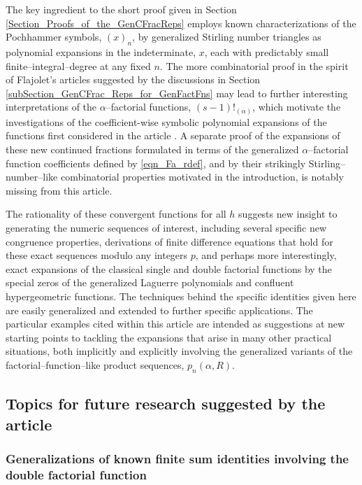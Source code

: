 \documentclass[12pt,reqno]{article}
\numberwithin{sfootnote}{section}
\numberwithin{equation}{section}
\theoremstyle{plain}
\theoremstyle{definition}
\theoremstyle{remark}
\newcommand{\Pochhammer}[2]{\ensuremath{\left(#1\right)_{#2}}}
\begin{document}
The key ingredient to the short proof given in 
Section \ref{Section_Proofs_of_the_GenCFracReps} 
employs known characterizations of the 
Pochhammer symbols, $\Pochhammer{x}{n}$, by 
generalized Stirling number triangles as 
polynomial expansions in the indeterminate, $x$, 
each with predictably small finite--integral--degree at any fixed $n$. 
The more combinatorial proof in the spirit of Flajolet's articles 
suggested by the discussions in 
Section \ref{subSection_GenCFrac_Reps_for_GenFactFns} 
may lead to further interesting interpretations of the 
$\alpha$--factorial functions, $(s-1)!_{(\alpha)}$, 
which motivate the investigations of the coefficient-wise 
symbolic polynomial expansions of the functions first considered in the 
article \citep{MULTIFACTJIS}. 
A separate proof of the expansions of these new continued fractions 
formulated in terms of the 
generalized $\alpha$--factorial function coefficients defined by 
\eqref{eqn_Fa_rdef}, and by their strikingly Stirling--number--like 
combinatorial properties motivated in the introduction, 
is notably missing from this article. 

The rationality of these convergent functions for all $h$ 
suggests new insight to generating the numeric sequences of interest, 
including several specific new congruence properties, derivations of 
finite difference equations that hold for these exact sequences 
modulo any integers $p$, and perhaps more interestingly, 
exact expansions of the classical single and double factorial functions 
by the special zeros of the generalized Laguerre polynomials and 
confluent hypergeometric functions. 
The techniques behind the specific identities given here 
are easily generalized and extended to further specific applications. 
The particular examples cited within this article 
are intended as suggestions at new 
starting points to tackling the expansions that arise in 
many other practical situations, both implicitly and explicitly 
involving the generalized variants of the factorial--function--like 
product sequences, $p_n(\alpha, R)$. 

\subsection{Topics for future research suggested by the article} 

\subsubsection{Generalizations of known finite sum identities involving the 
               double factorial function} 
\label{subsubSection_FutureResTopics_GenDblFactFnSumIdents_FiniteSums} 
\end{document}
